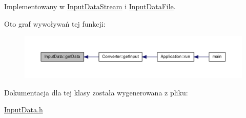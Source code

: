 \-Implementowany w \hyperlink{class_input_data_stream_aa25420a7aa42ed58124728ba30df0f71}{\-Input\-Data\-Stream} i \hyperlink{class_input_data_file_acdd212448e3fcd8bc6653e0c9a2fadfb}{\-Input\-Data\-File}.



\-Oto graf wywoływań tej funkcji\-:\nopagebreak
\begin{figure}[H]
\begin{center}
\leavevmode
\includegraphics[width=350pt]{class_input_data_ae1d8f8a2a2a7f7d4c4d3595ed767ef3d_icgraph}
\end{center}
\end{figure}




\-Dokumentacja dla tej klasy została wygenerowana z pliku\-:\begin{DoxyCompactItemize}
\item 
\hyperlink{_input_data_8h}{\-Input\-Data.\-h}\end{DoxyCompactItemize}
